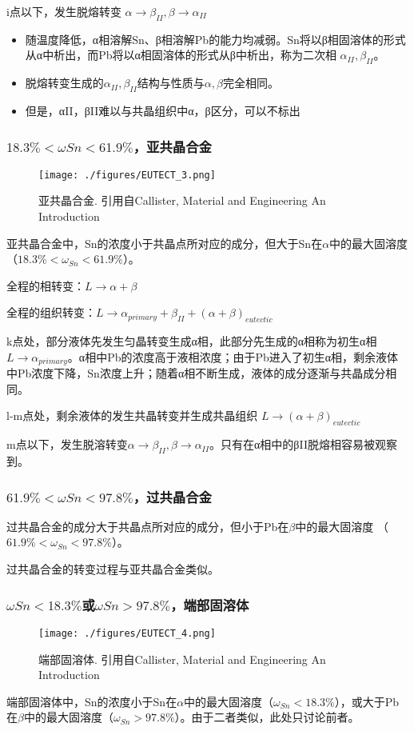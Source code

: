 i点以下，发生脱熔转变 $\alpha \rightarrow \beta_{II}, \beta \rightarrow \alpha_{II}$
\begin{itemize}
\item 随温度降低，α相溶解Sn、β相溶解Pb的能力均减弱。Sn将以β相固溶体的形式从α中析出，而Pb将以α相固溶体的形式从β中析出，称为二次相 $\alpha_{II},\beta_{II} $。
\item 脱熔转变生成的$\alpha_{II},\beta_{II} $结构与性质与$\alpha, \beta$完全相同。
\item 但是，αII，βII难以与共晶组织中α，β区分，可以不标出
\end{itemize}

\subsubsection{$18.3\%<\omega Sn<61.9\%$，亚共晶合金}
\begin{figure}[ht]
\centering
\texttt{[image: ./figures/EUTECT\_3.png]}
\caption{亚共晶合金. 引用自Callister, Material and Engineering An Introduction} \label{EUTECT_fig3}
\end{figure}

亚共晶合金中，Sn的浓度小于共晶点所对应的成分，但大于Sn在$\alpha$中的最大固溶度 （$18.3\%<\omega_{Sn}<61.9\%$）。

全程的相转变：$L \rightarrow \alpha+\beta$

全程的组织转变：$L \rightarrow \alpha_{primary}+\beta_{II}+(\alpha+\beta)_{eutectic}$

k点处，部分液体先发生匀晶转变生成α相，此部分先生成的α相称为初生α相$L \rightarrow \alpha_{primary}$。α相中Pb的浓度高于液相浓度；由于Pb进入了初生α相，剩余液体中Pb浓度下降，Sn浓度上升；随着α相不断生成，液体的成分逐渐与共晶成分相同。

l-m点处，剩余液体的发生共晶转变并生成共晶组织 $L \rightarrow (\alpha+\beta)_{eutectic}$

m点以下，发生脱溶转变$\alpha \rightarrow \beta_{II}, \beta \rightarrow \alpha_{II}$。只有在α相中的βII脱熔相容易被观察到。

\subsubsection{$61.9\%<\omega Sn<97.8\%$，过共晶合金}
过共晶合金的成分大于共晶点所对应的成分，但小于Pb在$\beta$中的最大固溶度 （$61.9\%<\omega_{Sn}<97.8\%$）。

过共晶合金的转变过程与亚共晶合金类似。

\subsubsection{$\omega Sn<18.3\%$或$\omega Sn>97.8\%$，端部固溶体}
\begin{figure}[ht]
\centering
\texttt{[image: ./figures/EUTECT\_4.png]}
\caption{端部固溶体. 引用自Callister, Material and Engineering An Introduction} \label{EUTECT_fig4}
\end{figure}
端部固溶体中，Sn的浓度小于Sn在$\alpha$中的最大固溶度（$\omega_{Sn}<18.3\%$），或大于Pb在$\beta$中的最大固溶度（$\omega_{Sn}>97.8\%$）。由于二者类似，此处只讨论前者。

